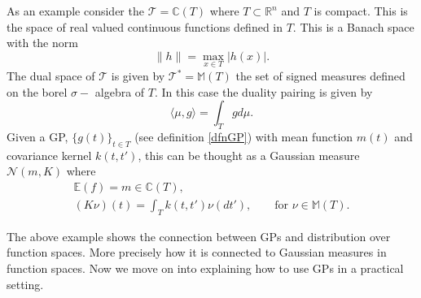 \documentclass[12pt]{book}
\newcommand{\E}{\mathbb{E}} %
\newcommand{\tvs}{\mathscr{T}} %
\begin{document}


As an example consider the  $\tvs=\mathbb{C}(T)$ where 
$T\subset\mathbb{R}^{n}$ and $T$ is compact. This is the  space of real valued continuous functions 
defined in 
$T$. This  is a Banach
space with the norm \cite{bressan1900lecture}
\begin{equation*}
\|h\|=\max_{x\in T}|h(x)|.
\end{equation*}
The dual space of $\tvs$ is given by $\tvs^{*}=\mathbb{M}(T)$ the set of signed measures defined on 
the borel $\sigma-$ algebra of  $T$. In this 
case the duality pairing is given by 
\begin{equation*}
\langle\mu,g \rangle=\int_{T}gd\mu.
\end{equation*}
Given a GP,  $\{g(t)\}_{t\in T}$ (see definition \ref{dfnGP}) with mean function $m(t)$ and 
covariance kernel $k(t,t')$, this can be thought as a Gaussian measure $\mathcal{N}(m,K)$
where
\cite{lifshits2012lectures} 
\begin{eqnarray*}
\E(f)=m\in\mathbb{C}(T), \\
(K\nu)(t)=\int_{T}k(t,t')\nu(dt'),\qquad\text{for }\nu\in\mathbb{M}(T).
\end{eqnarray*}

The above example shows the connection between GPs and distribution over function spaces. More
precisely how it is connected to Gaussian measures in function spaces. Now we move on
into explaining how to use GPs in a practical setting.
\end{document}
